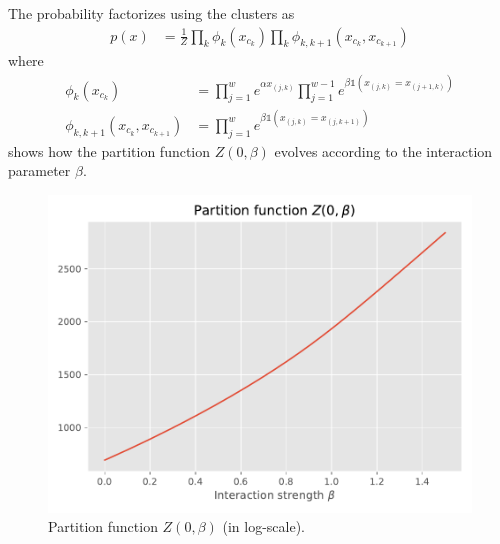 \documentclass[11pt]{article}
\begin{document}
The probability factorizes using the clusters as
\begin{align*}
	p(x) &= \frac{1}{Z}\prod_k
	\phi_k(x_{c_k})
	\prod_k
	\phi_{k,k+1}(x_{c_k},x_{c_{k+1}})
\end{align*}
where 
\begin{align*}
	\phi_k(x_{c_k}) &= \prod_{j=1}^w e^{\alpha x_{(j,k)}}
	\prod_{j=1}^{w-1} e^{
		\beta \mathds{1}(
			x_{(j,k)}=x_{(j+1,k)}
		)
	}  \\
	\phi_{k,k+1}(x_{c_k}, x_{c_{k+1}}) &=
	\prod_{j=1}^w e^{
		\beta \mathds{1}(
			x_{(j,k)}=x_{(j,k+1)}
		)
	}
\end{align*}
 shows how the partition function $Z(0,\beta)$ evolves according to the interaction parameter $\beta$.


\begin{figure}
	\centering
	\includegraphics[width=.75\linewidth]{images/graphs/ising_partition.pdf}
	\caption{Partition function $Z(0,\beta)$ (in log-scale).}\label{fig:IsingPartFunction}
\end{figure}
\end{document}
